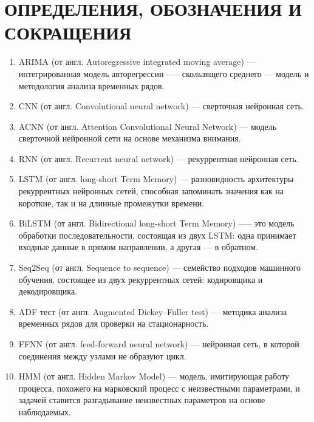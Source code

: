 \section*{ОПРЕДЕЛЕНИЯ, ОБОЗНАЧЕНИЯ И СОКРАЩЕНИЯ}

\begin{enumerate}[leftmargin=1.6\parindent]

\item ARIMA (от англ. Autoregressive integrated moving average) --- интегрированная модель авторегрессии —-- скользящего среднего ---  модель и методология анализа временных рядов.
\item CNN (от англ. Convolutional neural network) --- сверточная нейронная сеть. 
\item ACNN (от англ. Attention Convolutional Neural Network) --- модель сверточной нейронной сети на основе механизма внимания.
\item RNN (от англ. Recurrent neural network) --- рекуррентная нейронная сеть. 
\item LSTM (от англ. long-short Term Memory) --- разновидность архитектуры рекуррентных нейронных сетей, способная запоминать значения как на короткие, так и на длинные промежутки времени. 
\item BiLSTM (от англ. Bidirectional long-short Term Memory) —-- это модель обработки последовательности, состоящая из двух LSTM: одна принимает входные данные в прямом направлении, а другая — в обратном.
\item Seq2Seq (от англ. Sequence to sequence) ---  семейство подходов машинного обучения, состоящее из двух рекуррентных сетей: кодировщика и декодировщика.
\item ADF тест (от англ. Augmented Dickey–Fuller test) --- методика анализа временных рядов для проверки на стационарность.
\item FFNN (от англ. feed-forward neural network) --- нейронная сеть, в которой соединения между узлами не образуют цикл.
\item HMM (от англ. Hidden Markov Model) --- модель, имитирующая работу процесса, похожего на марковский процесс с неизвестными параметрами, и задачей ставится разгадывание неизвестных параметров на основе наблюдаемых.

\end{enumerate}
\pagebreak